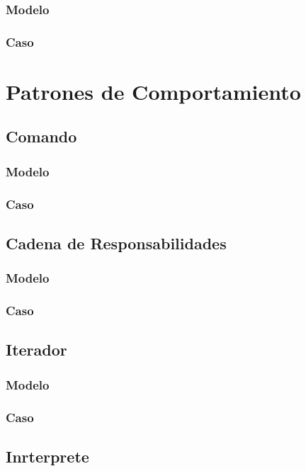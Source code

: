 \subsubsection{Modelo}
\newpage
\subsubsection{Caso}
\newpage

\section{Patrones de Comportamiento}

\subsection{Comando}
\subsubsection{Modelo}
\newpage
\subsubsection{Caso}
\newpage

\subsection{Cadena de Responsabilidades}
\subsubsection{Modelo}
\newpage
\subsubsection{Caso}
\newpage

\subsection{Iterador}
\subsubsection{Modelo}
\newpage
\subsubsection{Caso}
\newpage

\subsection{Inrterprete}
